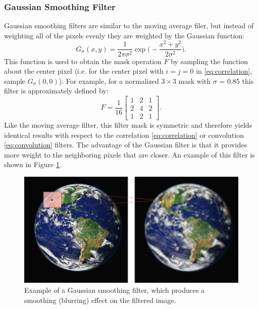 \subsubsection{Gaussian Smoothing Filter}
Gaussian smoothing filters are similar to the moving average filer, but instead of weighting all of the pixels evenly they are weighted by the Gaussian function:
\begin{equation*}
G_\sigma(x,y) = \frac{1}{2\pi\sigma^2} \exp \bigg(-\frac{x^2 + y^2}{2\sigma^2} \bigg).
\end{equation*}
This function is used to obtain the mask operation $F$ by sampling the function about the center pixel (i.e. for the center pixel with $i=j=0$ in \eqref{eq:correlation}, sample $G_\sigma(0,0)$). For example, for a normalized $3\times3$ mask with $\sigma$ = 0.85 this filter is approximately defined by:
\begin{equation*}
F = \frac{1}{16}
\begin{bmatrix}
1 & 2 & 1\\
2 & 4 & 2\\
1 & 2 & 1
\end{bmatrix}.
\end{equation*}
Like the moving average filter, this filter mask is symmetric and therefore yields identical results with respect to the correlation \eqref{eq:correlation} or convolution \eqref{eq:convolution} filters. The advantage of the Gaussian filter is that it provides more weight to the neighboring pixels that are closer.  An example of this filter is shown in Figure \ref{fig:gaussianfilter}.
\begin{figure}[ht]
  \centering
  \includegraphics[width=.8\textwidth]{tex/figs/ch10_figs/gaussianfilter.png}
    \caption{Example of a Gaussian smoothing filter, which produces a smoothing (blurring) effect on the filtered image.}
    \label{fig:gaussianfilter}
\end{figure}

